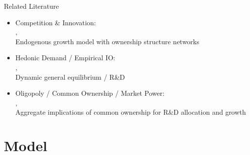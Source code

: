 \documentclass[
  10pt,
  aspectratio=169,   %
]{beamer}
\theoremstyle{plain}
\begin{document}
\begin{frame}{Related Literature}
  \begin{itemize}
    \item Competition \& Innovation: \\
          {\footnotesize\citet{d-Aspremont1988-je,Kamien1992-la,Aghion2001-yc,Aghion2005-vw,Acemoglu2012-bj,Aghion2013-nq,Bloom2013-pn,Lopez2019-sl,Peters2020-sd,Akcigit2021-ns,Akcigit2023-zl,Liu2022-iw,Cavenaile2023-lo}, \textbf{\citet{Hopenhayn2024-ya}}}\\
          \alert{Endogenous growth model with ownership structure networks}
          \medskip{}\pause
    \item Hedonic Demand / Empirical IO: \\
          {\footnotesize\citet{Lancaster1966-sg,Rosen1974-ep,Berry1995-lx,Nevo2001-ja}, \textbf{\citet{Pellegrino2024-dn,Ederer2024-rw}}}\\
          \alert{Dynamic general equilibrium / R\&D}
          \medskip{}\pause
    \item Oligopoly / Common Ownership / Market Power: \\
          {\footnotesize\citet{Rubinstein1983-pi,Rotemberg1984-jz,Neary2003-sn,Atkeson2008-zc,Gutierrez2017-wl,He2017-ix,Azar2018-cc,Azar2022-cn,Autor2020-mr,Baqaee2020-eb,De_Loecker2020-jn,Azar2021-uh,Edmond2023-bg}, \textbf{\citet{Anton2023-ej,Anton2024-pw,Kini2024-kd}}} \\
          \alert{Aggregate implications of common ownership for R\&D allocation and growth}
  \end{itemize}
\end{frame}

\section{Model}
\end{document}
